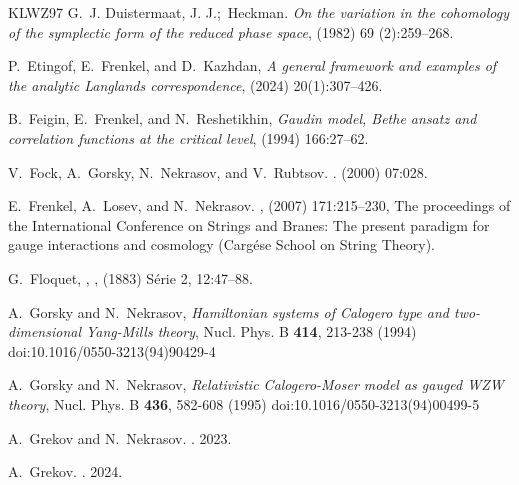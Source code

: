 \documentclass[12pt]{article}
\numberwithin{equation}{section}
\theoremstyle{definition}
\begin{document}
\begin{thebibliography}{KLWZ97}
G.~J. Duistermaat, J. J.;~Heckman.
\emph{On the variation in the cohomology of the symplectic form of the
  reduced phase space}, 
(1982) 69 (2):259--268.

P.~Etingof, E.~Frenkel, and D.~Kazhdan, 
\emph{A general framework and examples of the analytic Langlands
  correspondence}, 
 (2024) 20(1):307--426.

B.~Feigin, E.~Frenkel, and N.~Reshetikhin, 
\emph{Gaudin model, Bethe ansatz and correlation functions at the critical
  level}, 
(1994) 166:27--62.

V.~Fock, A.~Gorsky, N.~Nekrasov, and V.~Rubtsov.
.
 (2000) 07:028.

E.~Frenkel, A.~Losev, and N.~Nekrasov.
,
 (2007) 171:215--230, 
\newblock The proceedings of the International Conference on Strings and
  Branes: The present paradigm for gauge interactions and cosmology (Carg{\'e}se
  School on String Theory).

G.~Floquet,
,
, (1883) S{\'e}rie 2,
  12:47--88.
  
A.~Gorsky and N.~Nekrasov,
\emph{Hamiltonian systems of Calogero type and two-dimensional Yang-Mills theory},
Nucl. Phys. B \textbf{414}, 213-238 (1994)
doi:10.1016/0550-3213(94)90429-4

  
A.~Gorsky and N.~Nekrasov,
\emph{Relativistic Calogero-Moser model as gauged WZW theory},
Nucl. Phys. B \textbf{436}, 582-608 (1995)
doi:10.1016/0550-3213(94)00499-5

A.~Grekov and N.~Nekrasov.
.
 2023.

A.~Grekov.
.
 2024.


\end{thebibliography}
\end{document}
